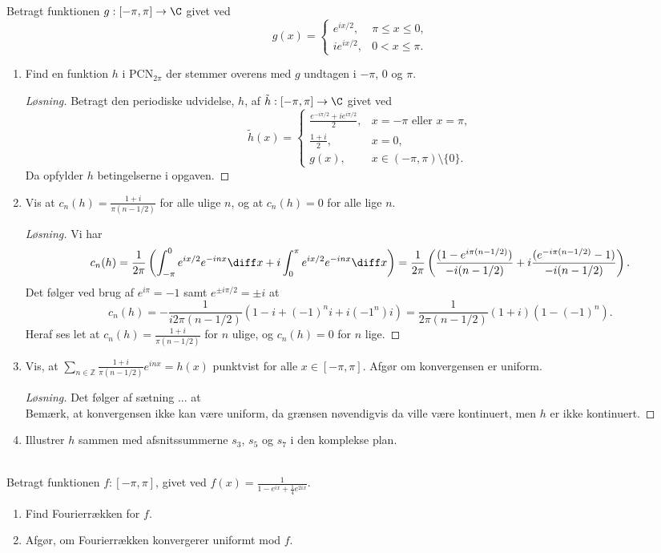\begin{opg}
	Betragt funktionen $ g:[-\pi,\pi]\to\C $ givet ved $$
	g(x)=\begin{cases}
	e^{ix/2},& \pi\leq x\leq 0,\\
	ie^{ix/2},& 0<x\leq \pi.
	\end{cases}
	$$
	\begin{enumerate}
		\item Find en funktion $ h $ i $ \text{PCN}_{2\pi} $ der stemmer overens med $ g $ undtagen i $ -\pi $, $ 0 $ og $ \pi $.
		\ifanswers
		\begin{proof}[Løsning]
			Betragt den periodiske udvidelse, $ h $, af $ \tilde{h}:[-\pi,\pi]\to\C $ givet ved $$ \tilde{h}(x)=\begin{cases}
			\frac{e^{-i\pi/2}+ie^{i\pi/2}}{2},& x=-\pi\text{ eller } x=\pi,\\
			\frac{1+i}{2},& x=0,\\
			g(x),&x\in(-\pi,\pi)\setminus\{0\}.
			\end{cases} $$
			Da opfylder $ h $ betingelserne i opgaven.
		\end{proof}
		\fi
		\item Vis at $ c_n(h)=\frac{1+i}{\pi(n-1/2)} $ for alle ulige $ n $, og at $ c_n(h)=0 $ for alle lige $ n $.
		\ifanswers
		\begin{proof}[Løsning]
			Vi har $$
			c_n(h)=\frac{1}{2\pi}\left(\int_{-\pi}^{0}e^{ix/2}e^{-inx} \diff x+i\int_{0}^{\pi}e^{ix/2}e^{-inx} \diff x\right)=\frac{1}{2\pi}\left(\frac{(1-e^{i\pi(n-1/2)})}{-i(n-1/2)}+i\frac{(e^{-i\pi(n-1/2)}-1)}{-i(n-1/2)}\right).
			$$
			Det følger ved brug af $ e^{i\pi}=-1 $ samt $ e^{\pm i\pi/2}=\pm i $ at$$
			c_n(h)=-\frac{1}{i2\pi(n-1/2)}(1-i+(-1)^ni+i(-1^n)i)=\frac{1}{2\pi(n-1/2)}(1+i)(1-(-1)^n).
			$$
			Heraf ses let at $ c_n(h)=\frac{1+i}{\pi(n-1/2)} $ for $ n $ ulige, og $c_n(h)=0  $ for $ n $ lige.
		\end{proof}
		\fi
		\item Vis, at $ \sum_{n\in\mathbb{Z}} \frac{1+i}{\pi(n-1/2)}e^{inx}=h(x) $ punktvist for alle $ x\in[-\pi,\pi] $. Afgør om konvergensen er uniform.
		\ifanswers
		\begin{proof}[Løsning]
			Det følger af sætning ... at\\
			Bemærk, at konvergensen ikke kan være uniform, da grænsen nøvendigvis da ville være kontinuert, men $ h $ er ikke kontinuert.
		\end{proof}
		\fi
		\item Illustrer $ h $ sammen med afsnitssummerne $ s_3 $, $ s_5 $ og $ s_7 $ i den komplekse plan.
	\end{enumerate}
	\begin{opg}\hfill\\
		Betragt funktionen $ f:[-\pi,\pi] $, givet ved $f(x)= \frac{1}{1-e^{ix}+\frac{1}{4}e^{2ix}} $. 
		\begin{enumerate}
			\item Find Fourierrækken for $ f $.
			\item Afgør, om Fourierrækken konvergerer uniformt mod $ f $.
		\end{enumerate}
	\end{opg}
\end{opg}